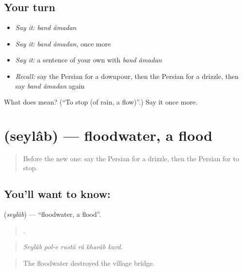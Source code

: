 \subsection*{Your turn}
\begin{itemize}
\raggedright
  \item \emph{Say it:} \emph{band âmadan}
  \item \emph{Say it:} \emph{band âmadan}, once more
  \item \emph{Say it:} a sentence of your own with \emph{band âmadan}
  \item \emph{Recall:} say the Persian for a downpour, then the Persian for a drizzle, then say \emph{band âmadan} again
\end{itemize}

\begin{tcolorbox}[breakable,colback=teal!4,colframe=teal!35!black,title={Before you move on}]
What does   mean? (\textquotedblleft{}To stop (of rain, a flow)\textquotedblright{}.) Say it once more.
\end{tcolorbox}
\section[\texorpdfstring{\fa{سیلاب} (seylâb)}{سیلاب (seylâb)}]{ (seylâb) — floodwater, a flood}

\label{lesson:FA-C474-seylab}



\begin{quote}
Before the new one: say the Persian for a drizzle, then the Persian for to stop.
\end{quote}

\subsection*{You'll want to know: }
\textbf{} (\emph{seylâb}) — \textquotedblleft{}floodwater, a flood\textquotedblright{}.

\begin{quote}
     .
\end{quote}

\begin{quote}
\emph{Seylâb pol-e rustâ râ kharâb kard.}
\end{quote}

\begin{quote}
The floodwater destroyed the village bridge.
\end{quote}

